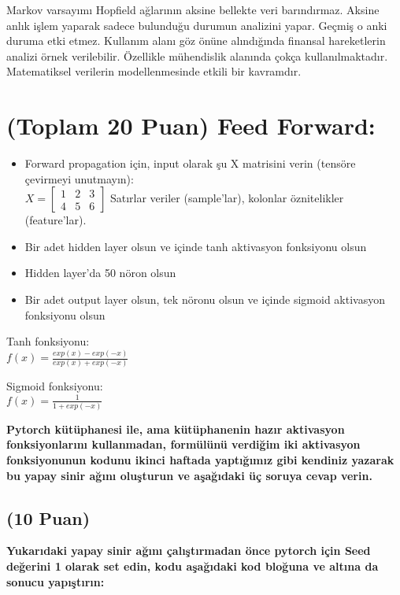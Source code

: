\documentclass[11pt]{article}
\begin{document}
Markov varsayımı Hopfield ağlarının aksine bellekte veri barındırmaz. Aksine anlık işlem yaparak sadece bulunduğu durumun analizini yapar. Geçmiş o anki duruma etki etmez. Kullanım alanı göz önüne alındığında finansal hareketlerin analizi örnek verilebilir. Özellikle mühendislik alanında çokça kullanılmaktadır. Matematiksel verilerin modellenmesinde etkili bir kavramdır.

\section{(Toplam 20 Puan) Feed Forward:}
 
\begin{itemize}
    \item Forward propagation için, input olarak şu X matrisini verin (tensöre çevirmeyi unutmayın):\\
    $X = \begin{bmatrix}
        1 & 2 & 3\\
        4 & 5 & 6
        \end{bmatrix}$
    Satırlar veriler (sample'lar), kolonlar öznitelikler (feature'lar).
    \item Bir adet hidden layer olsun ve içinde tanh aktivasyon fonksiyonu olsun
    \item Hidden layer'da 50 nöron olsun
    \item Bir adet output layer olsun, tek nöronu olsun ve içinde sigmoid aktivasyon fonksiyonu olsun
\end{itemize}

Tanh fonksiyonu:\\
$f(x) = \frac{exp(x) - exp(-x)}{exp(x) + exp(-x)}$
\vspace{.2in}

Sigmoid fonksiyonu:\\
$f(x) = \frac{1}{1 + exp(-x)}$

\vspace{.2in}
 \textbf{Pytorch kütüphanesi ile, ama kütüphanenin hazır aktivasyon fonksiyonlarını kullanmadan, formülünü verdiğim iki aktivasyon fonksiyonunun kodunu ikinci haftada yaptığımız gibi kendiniz yazarak bu yapay sinir ağını oluşturun ve aşağıdaki üç soruya cevap verin.}
 
\subsection{(10 Puan)} \textbf{Yukarıdaki yapay sinir ağını çalıştırmadan önce pytorch için Seed değerini 1 olarak set edin, kodu aşağıdaki kod bloğuna ve altına da sonucu yapıştırın:}
\end{document}
